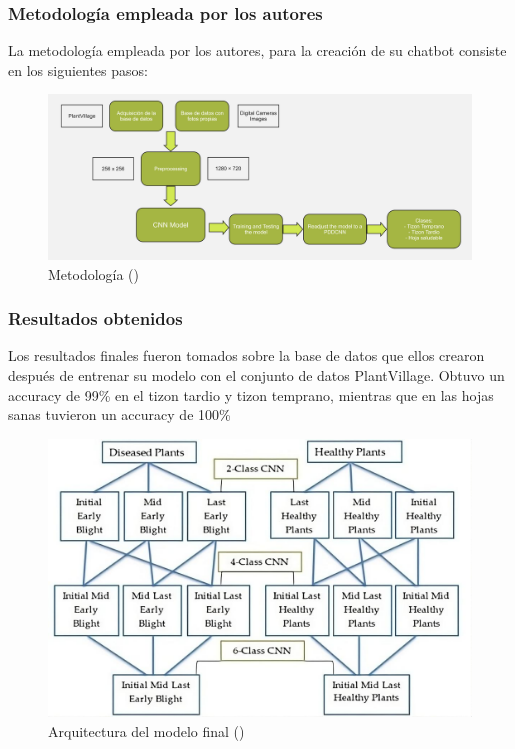 \subsubsection{Metodología empleada por los autores}
La metodología empleada por los autores, para la creación de su chatbot consiste en los siguientes pasos: 

\begin{figure}[H]
	\begin{center}
		\includegraphics[width=1\textwidth]{2/figures/ant6.jpg}
		\caption{Metodología (\cite{antecedente6})}
	\end{center}
\end{figure}

\subsubsection{Resultados obtenidos}
Los resultados finales fueron tomados sobre la base de datos que ellos crearon después de entrenar su modelo con el conjunto de datos PlantVillage. Obtuvo un accuracy de 99\% en el tizon tardio y tizon temprano, mientras que en las hojas sanas tuvieron un accuracy de 100\% 

\begin{figure}[H]
	\begin{center}
		\includegraphics[width=1\textwidth]{2/figures/ant6.2.jpeg}
		\caption{Arquitectura del modelo final (\cite{antecedente6})}
	\end{center}
\end{figure}
